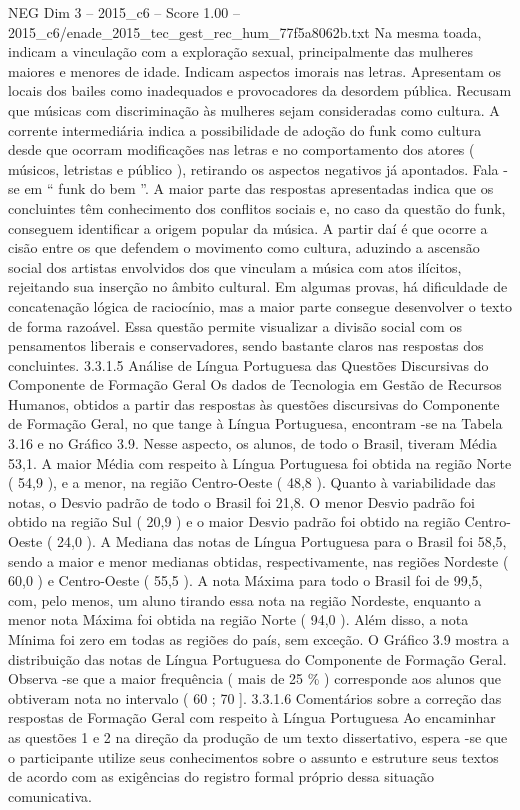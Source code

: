 \begin{textsample}{NEG Dim 3 – 2015\_c6 – Score 1.00 – 2015\_c6/enade\_2015\_tec\_gest\_rec\_hum\_77f5a8062b.txt}
Na mesma toada, indicam a vinculação com a exploração sexual, principalmente das mulheres maiores e menores de idade.
Indicam aspectos imorais nas letras.
Apresentam os locais dos bailes como inadequados e provocadores da desordem pública.
Recusam que músicas com discriminação às mulheres sejam consideradas como cultura.
A corrente intermediária indica a possibilidade de adoção do funk como cultura desde que ocorram modificações nas letras e no comportamento dos atores ( músicos, letristas e público ), retirando os aspectos negativos já apontados.
Fala -se em “ funk do bem ”.
A maior parte das respostas apresentadas indica que os concluintes têm conhecimento dos conflitos sociais e, no caso da questão do funk, conseguem identificar a origem popular da música.
A partir daí é que ocorre a cisão entre os que defendem o movimento como cultura, aduzindo a ascensão social dos artistas envolvidos dos que vinculam a música com atos ilícitos, rejeitando sua inserção no âmbito cultural.
Em algumas provas, há dificuldade de concatenação lógica de raciocínio, mas a maior parte consegue desenvolver o texto de forma razoável.
Essa questão permite visualizar a divisão social com os pensamentos liberais e conservadores, sendo bastante claros nas respostas dos concluintes. 3.3.1.5 Análise de Língua Portuguesa das Questões Discursivas do Componente de Formação Geral Os dados de Tecnologia em Gestão de Recursos Humanos, obtidos a partir das respostas às questões discursivas do Componente de Formação Geral, no que tange à Língua Portuguesa, encontram -se na Tabela 3.16 e no Gráfico 3.9.
Nesse aspecto, os alunos, de todo o Brasil, tiveram Média 53,1.
A maior Média com respeito à Língua Portuguesa foi obtida na região Norte ( 54,9 ), e a menor, na região Centro-Oeste ( 48,8 ).
Quanto à variabilidade das notas, o Desvio padrão de todo o Brasil foi 21,8.
O menor Desvio padrão foi obtido na região Sul ( 20,9 ) e o maior Desvio padrão foi obtido na região Centro-Oeste ( 24,0 ).
A Mediana das notas de Língua Portuguesa para o Brasil foi 58,5, sendo a maior e menor medianas obtidas, respectivamente, nas regiões Nordeste ( 60,0 ) e Centro-Oeste ( 55,5 ).
A nota Máxima para todo o Brasil foi de 99,5, com, pelo menos, um aluno tirando essa nota na região Nordeste, enquanto a menor nota Máxima foi obtida na região Norte ( 94,0 ).
Além disso, a nota Mínima foi zero em todas as regiões do país, sem exceção.
O Gráfico 3.9 mostra a distribuição das notas de Língua Portuguesa do Componente de Formação Geral.
Observa -se que a maior frequência ( mais de 25 \% ) corresponde aos alunos que obtiveram nota no intervalo ( 60 ; 70 ]. 3.3.1.6 Comentários sobre a correção das respostas de Formação Geral com respeito à Língua Portuguesa Ao encaminhar as questões 1 e 2 na direção da produção de um texto dissertativo, espera -se que o participante utilize seus conhecimentos sobre o assunto e estruture seus textos de acordo com as exigências do registro formal próprio dessa situação comunicativa.

\end{textsample}
